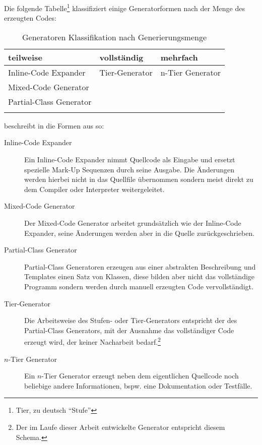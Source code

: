 Die folgende Tabelle\footnote{Tier, zu deutsch \enquote{Stufe}} klassifiziert einige Generatorformen nach der Menge des erzeugten Codes:
\begin{table}[htb]
    \begin{longtable}[c]{l l l}
        \toprule
        \rowcolor{lightgray}
        \textbf{teilweise}   & \textbf{vollständig}     & \textbf{mehrfach}\\
        \midrule
        Inline-Code Expander    & Tier-Generator    & n-Tier Generator\\
        Mixed-Code Generator & &\\
        Partial-Class Generator & & \\
        \bottomrule
        \caption{Generatoren Klassifikation nach Generierungsmenge}
        \label{tab:generatorclassification}
    \end{longtable} 
\end{table}

\citeauthor{herrington2003code} beschreibt in \cite[Kapitel 4][]{herrington2003code} die Formen aus  so:
\begin{description}
    \item[Inline-Code Expander]
        Ein Inline-Code Expander nimmt Quellcode als Eingabe und ersetzt spezielle Mark-Up Sequenzen durch seine Ausgabe. Die Änderungen werden hierbei nicht in das Quellfile übernommen sondern meist direkt zu dem Compiler oder Interpreter weitergeleitet.
    \item[Mixed-Code Generator]
        Der Mixed-Code Generator arbeitet grundsätzlich wie der Inline-Code Expander, seine Änderungen werden aber in die Quelle zurückgeschrieben.
    \item[Partial-Class Generator]
        Partial-Class Generatoren erzeugen aus einer abstrakten Beschreibung und Templates einen Satz von Klassen, diese bilden aber nicht das vollständige Programm sondern werden durch manuell erzeugten Code vervollständigt. %
    \item[Tier-Generator]
        Die Arbeitsweise des Stufen- oder Tier-Generators entspricht der des Partial-Class Generators, mit der Ausnahme das vollständiger Code erzeugt wird, der keiner Nacharbeit bedarf.\footnote{Der im Laufe dieser Arbeit entwickelte Generator entspricht diesem Schema.}
    \item[$n$-Tier Generator] 
        Ein $n$-Tier Generator erzeugt neben dem eigentlichen Quellcode noch beliebige andere Informationen, bspw. eine Dokumentation oder Testfälle.
\end{description}

